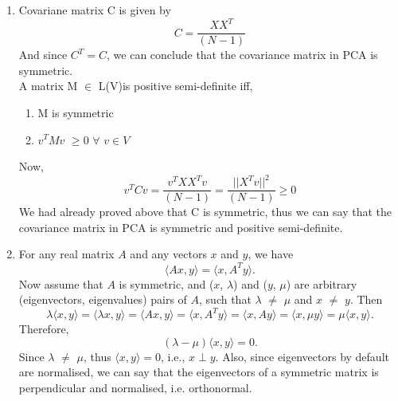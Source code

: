 \documentclass{article}
\begin{document}
\begin{enumerate}
\begin{enumerate}
    \item Covariane matrix C is given by 
        \[
            C = \frac{X X^T}{(N - 1)}
        \]
        And since $C^T \equal C$, we can conclude that the covariance matrix in PCA is symmetric. \\
        A matrix M $\in$ L(V)is positive semi-definite iff, 
        \begin{enumerate}
            \item M is symmetric
            \item $v^TMv$  $\geq 0$ $\forall$   $v \in V$ 
        \end{enumerate}
        Now, 
        \[
            v^TCv = \frac{v^TXX^Tv}{(N - 1)} = \frac{|| X^T v||^2}{(N - 1)} \geq 0
        \]
        We had already proved above that C is symmetric, thus we can say that the covariance matrix in PCA is symmetric and positive semi-definite.
    \item For any real matrix $A$ and any vectors $x$ and $y$, we have
    \[
        \langle Ax, y \rangle = \langle x, A^T y \rangle.
    \]
    Now assume that $A$ is symmetric, and ($x$,  $\lambda$) and ($y$, $\mu$) are arbitrary (eigenvectors, eigenvalues) pairs of $A$, such that $\lambda$  $\neq$ $\mu$ and $x$ $\neq$ $y$. Then
    \[
        \lambda \langle x, y \rangle = \langle \lambda x, y \rangle = \langle Ax, y \rangle = \langle x, A^T y \rangle = \langle x, Ay \rangle = \langle x, \mu y \rangle = \mu \langle x, y \rangle.
    \]
    Therefore, 
    \[
        (\lambda - \mu) \langle x, y \rangle = 0.
    \]
    Since $\lambda$  $\neq$ $\mu$, thus $\langle x, y \rangle = 0$, i.e., $x \perp y$. Also, since eigenvectors by default are normalised, we can say that the eigenvectors of a symmetric matrix is perpendicular and normalised, i.e. orthonormal.
    

\end{enumerate}
\end{enumerate}
\end{document}
